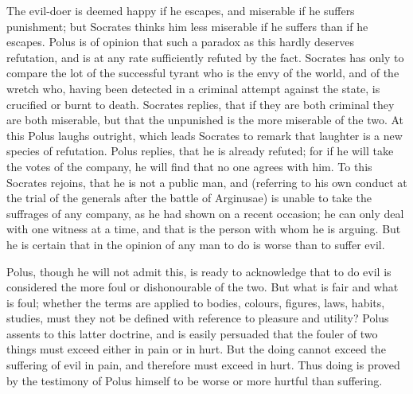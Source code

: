 \documentclass[11pt,letter]{article}
\begin{document}
\par  The evil-doer is deemed happy if he escapes, and miserable if he suffers punishment; but Socrates thinks him less miserable if he suffers than if he escapes. Polus is of opinion that such a paradox as this hardly deserves refutation, and is at any rate sufficiently refuted by the fact. Socrates has only to compare the lot of the successful tyrant who is the envy of the world, and of the wretch who, having been detected in a criminal attempt against the state, is crucified or burnt to death. Socrates replies, that if they are both criminal they are both miserable, but that the unpunished is the more miserable of the two. At this Polus laughs outright, which leads Socrates to remark that laughter is a new species of refutation. Polus replies, that he is already refuted; for if he will take the votes of the company, he will find that no one agrees with him. To this Socrates rejoins, that he is not a public man, and (referring to his own conduct at the trial of the generals after the battle of Arginusae) is unable to take the suffrages of any company, as he had shown on a recent occasion; he can only deal with one witness at a time, and that is the person with whom he is arguing. But he is certain that in the opinion of any man to do is worse than to suffer evil.

\par  Polus, though he will not admit this, is ready to acknowledge that to do evil is considered the more foul or dishonourable of the two. But what is fair and what is foul; whether the terms are applied to bodies, colours, figures, laws, habits, studies, must they not be defined with reference to pleasure and utility? Polus assents to this latter doctrine, and is easily persuaded that the fouler of two things must exceed either in pain or in hurt. But the doing cannot exceed the suffering of evil in pain, and therefore must exceed in hurt. Thus doing is proved by the testimony of Polus himself to be worse or more hurtful than suffering.
\end{document}
